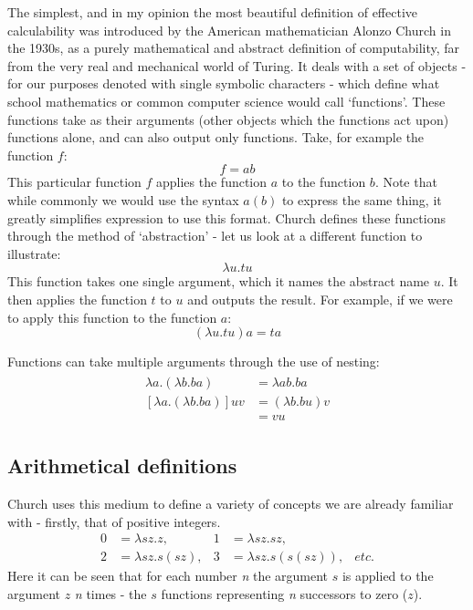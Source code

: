 \documentclass[Master.tex]{subfiles}
\begin{document}
The simplest, and in my opinion the most beautiful definition of effective calculability was introduced by the American mathematician Alonzo Church in the 1930s, as a purely mathematical and abstract definition of computability, far from the very real and mechanical world of Turing. It deals with a set of objects - for our purposes denoted with single symbolic characters - which define what school mathematics or common computer science would call `functions'. These functions take as their arguments (other objects which the functions act upon) functions alone, and can also output only functions. Take, for example the function $f$:
\begin{equation*}
f = ab
\end{equation*}
This particular function $f$ applies the function $a$ to the function $b$. Note that while commonly we would use the syntax $a(b)$ to express the same thing, it greatly simplifies expression to use this format. Church defines these functions through the method of `abstraction' - let us look at a different function to illustrate:
\begin{equation*}
\lambda u.tu
\end{equation*}
This function takes one single argument, which it names the abstract name $u$. It then applies the function $t$ to $u$ and outputs the result. For example, if we were to apply this function to the function $a$:
\begin{equation*}
(\lambda u.tu) a = ta	
\end{equation*}

Functions can take multiple arguments through the use of nesting:
\begin{gather*}
\begin{aligned}
\lambda a.(\lambda b.ba) &=  \lambda ab.ba \\
[\lambda a.(\lambda b.ba)]uv &= (\lambda b.bu)v \\ &= vu
\end{aligned}
\end{gather*}

\subsection{Arithmetical definitions}

Church uses this medium to define a variety of concepts we are already familiar with - firstly, that of positive integers.
\cite{church1941lambda}
\begin{equation*}
\begin{aligned}
\bm{\mathrm{0}} &= \lambda sz.z,
  & %
\bm{\mathrm{1}} &= \lambda sz.sz,
  \\
\bm{\mathrm{2}} &= \lambda sz.s(sz),
  &
\bm{\mathrm{3}} &= \lambda sz.s(s(sz)),
  &
etc.
\end{aligned}
\end{equation*}
Here it can be seen that for each number \textit{n} the argument $s$ is applied to the argument $z$ \textit{n} times - the $s$ functions representing \textit{n} successors to zero ($z$).
\end{document}
